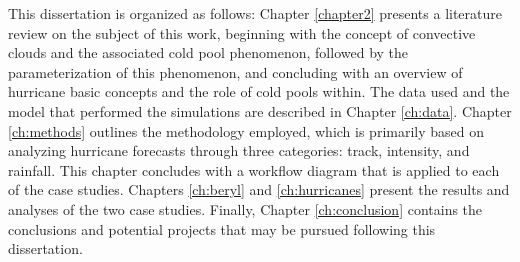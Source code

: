 This dissertation is organized as follows: Chapter \ref{chapter2} presents a literature review on the subject of this work, beginning with the concept of convective clouds and the associated cold pool phenomenon, followed by the parameterization of this phenomenon, and concluding with an overview of hurricane basic concepts and the role of cold pools within. The data used and the model that performed the simulations are described in Chapter \ref{ch:data}. Chapter \ref{ch:methods} outlines the methodology employed, which is primarily based on analyzing hurricane forecasts through three categories: track, intensity, and rainfall. This chapter concludes with a workflow diagram that is applied to each of the case studies. Chapters \ref{ch:beryl} and \ref{ch:hurricanes} present the results and analyses of the two case studies. Finally, Chapter \ref{ch:conclusion} contains the conclusions and potential projects that may be pursued following this dissertation.
